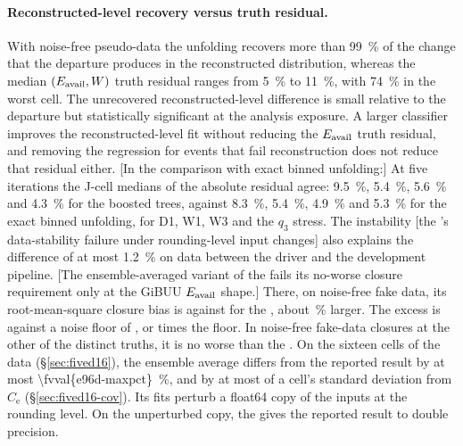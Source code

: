 \paragraph{Reconstructed-level recovery versus truth residual.} With noise-free pseudo-data the unfolding recovers more than \SI{99}{\percent} of the change that the departure produces in the reconstructed distribution, whereas the median $(E_{\mathrm{avail}},W)$ truth residual ranges from \SI{5}{\percent} to \SI{11}{\percent}, with \SI{74}{\percent} in the worst cell. The unrecovered reconstructed-level difference is small relative to the departure but statistically significant at the analysis exposure. A larger classifier improves the reconstructed-level fit without reducing the $E_{\mathrm{avail}}$ truth residual, and removing the regression for events that fail reconstruction does not reduce that residual either. [In the comparison with exact binned unfolding:] At five iterations the J-cell medians of the absolute residual agree: \SI{9.5}{\percent}, \SI{5.4}{\percent}, \SI{5.6}{\percent} and \SI{4.3}{\percent} for the boosted trees, against \SI{8.3}{\percent}, \SI{5.4}{\percent}, \SI{4.9}{\percent} and \SI{5.3}{\percent} for the exact binned unfolding, for D1, W1, W3 and the $q_3$ stress. The instability [the \estMultiD{}'s data-stability failure under rounding-level input changes] also explains the difference of at most \SI{1.2}{\percent} on data between the driver and the development pipeline. [The ensemble-averaged variant of the \estMultiD{} fails its no-worse closure requirement only at the GiBUU $E_{\mathrm{avail}}$ shape.] There, on noise-free fake data, its root-mean-square closure bias is  against  for the \estMultiD{}, about \,\% larger. The excess is  against a noise floor of , or  times the floor. In noise-free fake-data closures at the other  of the  distinct truths, it is no worse than the \estMultiD{}. On the sixteen cells of the data (\S\ref{sec:fived16}), the ensemble average differs from the reported result by at most \SI{\fvval{e96d-maxpct}}{\percent}, and by at most  of a cell's standard deviation from $C_{\mathrm{e}}$ (\S\ref{sec:fived16-cov}). Its fits perturb a float64 copy of the inputs at the rounding level. On the unperturbed copy, the \estMultiD{} gives the reported result to double precision.

